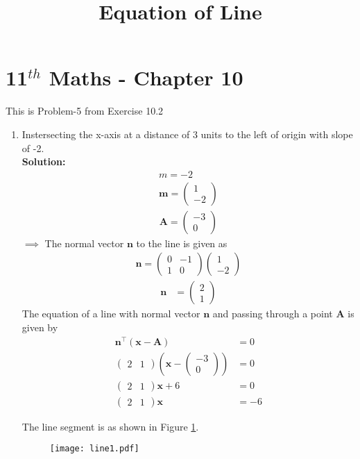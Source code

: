 \documentclass[journal,10pt,twocolumn]{article}
\providecommand{\brak}[1]{\ensuremath{\left(#1\right)}}
\newcommand{\solution}{\noindent \textbf{Solution: }}
\newcommand{\myvec}[1]{\ensuremath{\begin{pmatrix}#1\end{pmatrix}}}
\let\vec\mathbf
\begin{document}
\begin{center}
\title{\textbf{Equation  of Line}}
\date{\vspace{-5ex}} %
\maketitle
\end{center}
\setcounter{page}{1}

\section{11$^{th}$ Maths - Chapter 10}
This is Problem-5 from Exercise 10.2
\begin{enumerate}
\item Instersecting the x-axis at a distance of 3 units to the left of origin with slope of -2.
\\

\solution 
\\
\begin{align}		
m=-2\\
\vec{m}=\myvec{1\\-2}
\end{align}
\begin{align}
\vec{A}=\myvec{-3\\0}
\end{align}
$\implies$ The normal vector $\vec{n}$ to the line is given as
\begin{align}
\vec{n}=\myvec{0&-1\\1&0}\myvec{1\\-2}
\end{align}
\begin{align}
\vec{n} &= \myvec{2 \\1} 
\end{align}
The equation of a line with normal vector $\vec{n}$ and passing through a point $\vec{A}$ is given by
\begin{align}
	\vec{n}^\top\brak{\vec{x}-\vec{A}} &= 0 \\
	\myvec { 2 & 1 } \brak{ \vec{x} - \myvec{ -3 \\ 0}} &= 0  \\
	\myvec{ 2 & 1} \vec{x} +6 &= 0 \\
        \label{eq:1}
	\myvec{ 2 & 1} \vec{x}  &= -6
\end{align}

 The line segment is as shown in Figure \ref{fig:Fig1}.
\begin{figure}[!h]
	\begin{center}
		\texttt{[image: line1.pdf]}
	\end{center}
\caption{}
\label{fig:Fig1}
\end{figure}

\end{enumerate}
\end{document}
